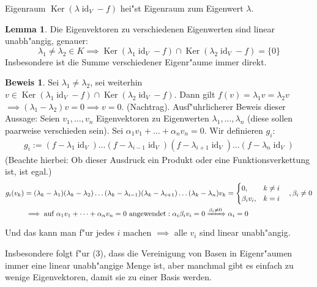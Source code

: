 \documentclass[fontsize=11pt,paper=a4,BCOR=0mm,DIV=11,automark,headsepline]{scrbook}
\newcommand{\gq}[1]{\glqq{}#1\grqq{}} %
\DeclareMathOperator{\mKer}{Ker}
\DeclareMathOperator{\mId}{id}
\theoremstyle{remark}
\theoremstyle{definition}
\newtheorem{lemma}{Lemma}[section]
\theoremstyle{proof}
\newtheorem*{prof}{Beweis}
\theoremstyle{remark}
\begin{document}
\begin{definition}{Eigenraum}{}
  \(\mKer(\lambda\mId_V-f)\) hei"st Eigenraum zum Eigenwert \(\lambda\).
\end{definition}
\begin{lemma}
  Die Eigenvektoren zu verschiedenen Eigenwerten sind linear unabh"angig, genauer: \[\lambda_1\neq\lambda_2\in K\implies\mKer(\lambda_1\mId_V-f)\cap\mKer(\lambda_2\mId_V-f)=\{0\}\]
  Insbesondere ist die Summe verschiedener Eigenr"aume immer direkt.
\end{lemma}
\begin{prof}
  Sei \(\lambda_1\neq\lambda_2\), sei weiterhin \(v\in\mKer(\lambda_1\mId_V-f)\cap\mKer(\lambda_2\mId_V-f)\). Dann gilt \(f(v)=\lambda_1v=\lambda_2v\) \(\implies(\lambda_1-\lambda_2)v = 0\implies v = 0\).
(Nachtrag). Ausf"uhrlicherer Beweis dieser Aussage: Seien \(v_1,\dots,v_n\) Eigenvektoren zu Eigenwerten \(\lambda_1,\dots,\lambda_n\) (diese sollen paarweise verschieden sein). Sei \(\alpha_1 v_1+\dots + \alpha_nv_n = 0\). Wir definieren \(g_i\):
  \begin{align*}
    g_i := (f-\lambda_1\mId_V)\dots(f-\lambda_{i-1}\mId_V)(f-\lambda_{i+1}\mId_V)\dots(f-\lambda_n\mId_V)
  \end{align*}
  (Beachte hierbei: Ob dieser Ausdruck ein Produkt oder eine Funktionsverkettung ist, ist egal.)
  \begin{align*}
    g_i(v_k) &= (\lambda_k-\lambda_1)(\lambda_k-\lambda_2)\dots(\lambda_k-\lambda_{i-1})(\lambda_k-\lambda_{i+1})\dots(\lambda_k-\lambda_n)v_k =
               \begin{cases}
                 0, & k\neq i \\
                 \beta_iv_i, & k = i
               \end{cases} \quad ,\beta_i\neq 0 \\
    &\implies \text{auf }\alpha_1v_1+\dots +\alpha_nv_n = 0\text{ angewendet}: \alpha_i\beta_iv_i = 0 \xRightarrow{\beta_i \neq 0} \alpha_i = 0
  \end{align*}
  Und das kann man f"ur jedes \(i\) machen \(\implies\) alle \(v_i\) sind linear unabh"angig.
\end{prof}
Insbesondere folgt f"ur (3), dass die Vereinigung von Basen in Eigenr"aumen immer eine linear unabh"angige Menge ist, aber manchmal gibt es einfach \gq{zu wenige} Eigenvektoren, damit sie zu einer Basis werden.
\end{document}
